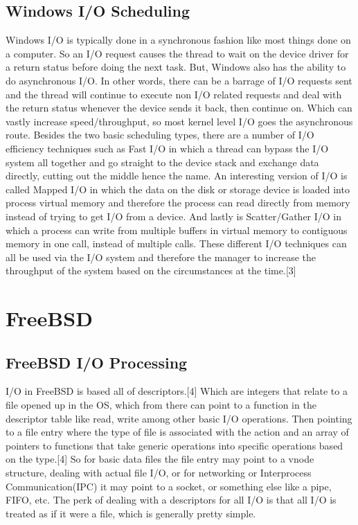 \documentclass[10pt,conference,draftclsnofoot,onecolumn]{IEEEtran}
\begin{document}
\subsection{Windows I/O Scheduling}
Windows I/O is typically done in a synchronous fashion like most things done on a computer. So an I/O request causes the thread to wait on the device driver for a return status before doing the next task.
But, Windows also has the ability to do asynchronous I/O. In other words, there can be a barrage of I/O requests sent and the thread will continue to execute non I/O related requests and deal with the return status whenever the device sends it back, then continue on. Which can vastly increase speed/throughput, so most kernel level I/O goes the asynchronous route.
Besides the two basic scheduling types, there are a number of I/O efficiency techniques such as Fast I/O in which a thread can bypass the I/O system all together and go straight to the device stack and exchange data directly, cutting out the middle hence the name.
An interesting version of I/O is called Mapped I/O in which the data on the disk or storage device is loaded into process virtual memory and therefore the process can read directly from memory instead of trying to get I/O from a device. And lastly is Scatter/Gather I/O in which a process can write from multiple buffers in virtual memory to contiguous memory in one call, instead of multiple calls. These different I/O techniques can all be used via the I/O system and therefore the manager to increase the throughput of the system based on the circumstances at the time.[3]


\section{FreeBSD}
\subsection{FreeBSD I/O Processing}
I/O in FreeBSD is based all of descriptors.[4] Which are integers that relate to a file opened up in the OS, which from there can point to a function in the descriptor table like read, write among other basic I/O operations. Then pointing to a file entry where the type of file is associated with the action and an array of pointers to functions that take generic operations into specific operations based on the type.[4] So for basic data files the file entry may point to a vnode structure, dealing with actual file I/O, or for networking or Interprocess Communication(IPC) it may point to a socket, or something else like a pipe, FIFO, etc. The perk of dealing with a descriptors for all I/O is that all I/O is treated as if it were a file, which is generally pretty simple.
\end{document}
